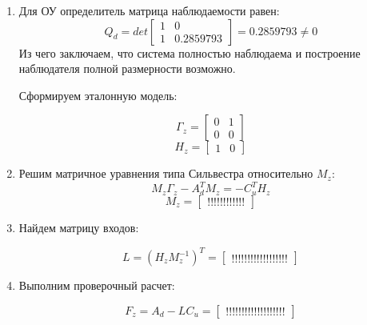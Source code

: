 \documentclass[a4paper,14pt]{extreport}
\begin{document}
	\begin{enumerate}
		\item 
		
		Для ОУ определитель матрица наблюдаемости равен:
		\begin{equation}
		Q_d =det
		\begin{bmatrix}
		1&    0\\         
		1 &   0.2859793  
		\end{bmatrix}
		=0.2859793  \ne 0
		\end{equation}
		Из чего заключаем, что система полностью наблюдаема и построение наблюдателя полной размерности возможно.
		
		Сформируем эталонную модель:
		
		\begin{equation}
		\Gamma_z =
		\begin{bmatrix}
		0 & 1\\
		0 & 0
		\end{bmatrix}
		\end{equation}
		\begin{equation}
		H_z = 
		\begin{bmatrix}
		1 & 0
		\end{bmatrix}
		\end{equation}
		
		\item Решим матричное уравнения типа Сильвестра относительно $M_z$:
		\begin{equation}
			M_z \Gamma_z - A_d^T M_z = - C_u^T H_z
		\end{equation}
		\begin{equation}
		M_z =
		\begin{bmatrix}
!!!!!!!!!!!!
		\end{bmatrix}
		\end{equation}
		
		\item Найдем матрицу входов:
		
		\begin{equation}
			L = (H_z M_z^{-1})^T = 
			\begin{bmatrix}
!!!!!!!!!!!!!!!!!!
			\end{bmatrix}
		\end{equation}

		\item Выполним проверочный расчет:
		
		\begin{equation}
			F_z = A_d - L C_u = 
			\begin{bmatrix}
!!!!!!!!!!!!!!!!!!!
			\end{bmatrix}
		\end{equation}
		

\end{enumerate}
\end{document}
